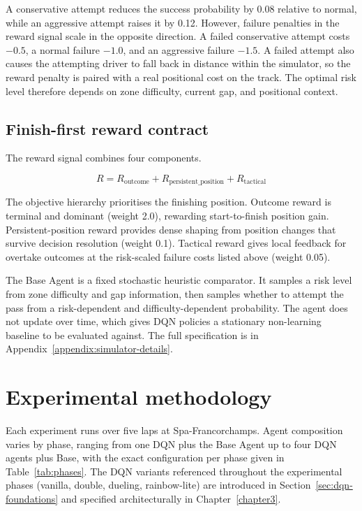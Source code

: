 A conservative attempt reduces the success probability by 0.08 relative to normal, while an aggressive attempt raises it by 0.12. However, failure penalties in the reward signal scale in the opposite direction. A failed conservative attempt costs $-0.5$, a normal failure $-1.0$, and an aggressive failure $-1.5$. A failed attempt also causes the attempting driver to fall back in distance within the simulator, so the reward penalty is paired with a real positional cost on the track. The optimal risk level therefore depends on zone difficulty, current gap, and positional context.

\subsection{Finish-first reward contract}

The reward signal combines four components.

\[
R = R_{\text{outcome}} + R_{\text{persistent\_position}} + R_{\text{tactical}}
\]

The objective hierarchy prioritises the finishing position. Outcome reward is terminal and dominant (weight 2.0), rewarding start-to-finish position gain. Persistent-position reward provides dense shaping from position changes that survive decision resolution (weight 0.1). Tactical reward gives local feedback for overtake outcomes at the risk-scaled failure costs listed above (weight 0.05).

The Base Agent is a fixed stochastic heuristic comparator. It samples a risk level from zone difficulty and gap information, then samples whether to attempt the pass from a risk-dependent and difficulty-dependent probability. The agent does not update over time, which gives DQN policies a stationary non-learning baseline to be evaluated against. The full specification is in Appendix~\ref{appendix:simulator-details}.

\section{Experimental methodology}
\label{sec:marl-methodology}

Each experiment runs over five laps at Spa-Francorchamps. Agent composition varies by phase, ranging from one DQN plus the Base Agent up to four DQN agents plus Base, with the exact configuration per phase given in Table~\ref{tab:phases}. The DQN variants referenced throughout the experimental phases (vanilla, double, dueling, rainbow-lite) are introduced in Section~\ref{sec:dqn-foundations} and specified architecturally in Chapter~\ref{chapter3}.

